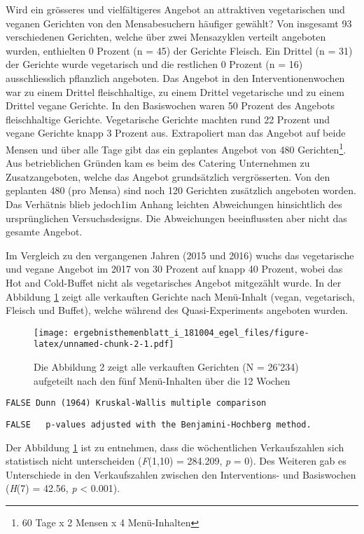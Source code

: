 \documentclass[12pt,ngerman,]{article}
\let\rmarkdownfootnote\footnote%
\def\footnote{\protect\rmarkdownfootnote}
\begin{document}
Wird ein grösseres und vielfältigeres Angebot an attraktiven
vegetarischen und veganen Gerichten von den Mensabesuchern häufiger
gewählt? Von insgesamt 93 verschiedenen Gerichten, welche über zwei
Mensazyklen verteilt angeboten wurden, enthielten 0 Prozent (n = 45) der
Gerichte Fleisch. Ein Drittel (n = 31) der Gerichte wurde vegetarisch
und die restlichen 0 Prozent (n = 16) ausschliesslich pflanzlich
angeboten. Das Angebot in den Interventionenwochen war zu einem Drittel
fleischhaltige, zu einem Drittel vegetarische und zu einem Drittel
vegane Gerichte. In den Basiswochen waren 50 Prozent des Angebots
fleischhaltige Gerichte. Vegetarische Gerichte machten rund 22 Prozent
und vegane Gerichte knapp 3 Prozent aus. Extrapoliert man das Angebot
auf beide Mensen und über alle Tage gibt das ein geplantes Angebot von
480 Gerichten\footnote{60 Tage x 2 Mensen x 4 Menü-Inhalten}. Aus
betrieblichen Gründen kam es beim des Catering Unternehmen zu
Zusatzangeboten, welche das Angebot grundsätzlich vergrösserten. Von den
geplanten 480 (pro Mensa) sind noch 120 Gerichten zusätzlich angeboten
worden. Das Verhätnis blieb jedoch1im Anhang leichten Abweichungen
hinsichtlich des ursprünglichen Versuchsdesigns. Die Abweichungen
beeinflussten aber nicht das gesamte Angebot.

Im Vergleich zu den vergangenen Jahren (2015 und 2016) wuchs das
vegetarische und vegane Angebot im 2017 von 30 Prozent auf knapp 40
Prozent, wobei das Hot and Cold-Buffet nicht als vegetarisches Angebot
mitgezählt wurde. In der Abbildung \ref{fig:fig2} zeigt alle verkauften
Gerichte nach Menü-Inhalt (vegan, vegetarisch, Fleisch und Buffet),
welche während des Quasi-Experiments angeboten wurden.

\begin{figure}
\centering
\texttt{[image: ergebnisthemenblatt\_i\_181004\_egel\_files/figure-latex/unnamed-chunk-2-1.pdf]}
\caption{\label{fig:fig2} Die Abbildung 2 zeigt alle verkauften
Gerichten (N = 26'234) aufgeteilt nach den fünf Menü-Inhalten über die
12 Wochen}
\end{figure}

\begin{verbatim}
FALSE Dunn (1964) Kruskal-Wallis multiple comparison
\end{verbatim}

\begin{verbatim}
FALSE   p-values adjusted with the Benjamini-Hochberg method.
\end{verbatim}

Der Abbildung \ref{fig:fig2} ist zu entnehmen, dass die wöchentlichen
Verkaufszahlen sich statistisch nicht unterscheiden (\emph{F}(1,10) =
284.209, \emph{p} = 0). Des Weiteren gab es Unterschiede in den
Verkaufszahlen zwischen den Interventions- und Basiswochen (\emph{H}(7)
= 42.56, \emph{p} \textless{} 0.001).
\end{document}
